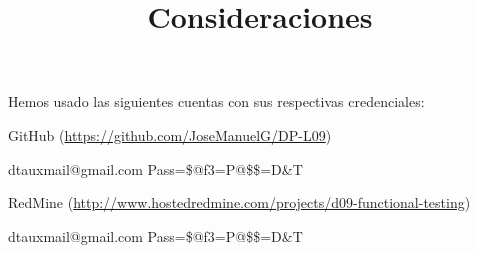 \documentclass[a4paper]{article}
\title{Consideraciones}
\date{}
\begin{document}
\setlength{\voffset}{-1in}
\setlength{\textheight}{680px}
\setlength{\headsep}{30px}
\maketitle

Hemos usado las siguientes cuentas con sus respectivas credenciales:

GitHub (\url{https://github.com/JoseManuelG/DP-L09})

dtauxmail@gmail.com  Pass=\$@f3=P@\$\$=D\&T

RedMine (\url{http://www.hostedredmine.com/projects/d09-functional-testing})

dtauxmail@gmail.com  Pass=\$@f3=P@\$\$=D\&T
\end{document}
